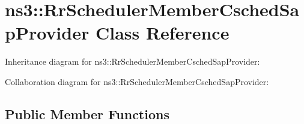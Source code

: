 \hypertarget{classns3_1_1RrSchedulerMemberCschedSapProvider}{}\section{ns3\+:\+:Rr\+Scheduler\+Member\+Csched\+Sap\+Provider Class Reference}
\label{classns3_1_1RrSchedulerMemberCschedSapProvider}


Inheritance diagram for ns3\+:\+:Rr\+Scheduler\+Member\+Csched\+Sap\+Provider\+:


Collaboration diagram for ns3\+:\+:Rr\+Scheduler\+Member\+Csched\+Sap\+Provider\+:
\subsection*{Public Member Functions}
